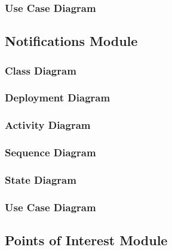 \documentclass{article}
\begin{document}
			
			\subsubsection{Use Case Diagram}\label{subsec:uml-diagrams-events-uc}
						
		\clearpage			
			
		\subsection{Notifications Module}\label{subsec:uml-diagrams-notifications}
		
		
			\subsubsection{Class Diagram}\label{subsec:uml-diagrams-notifications-class}
			
			
			\subsubsection{Deployment Diagram}\label{subsec:uml-diagrams-notifications-dep}
			
			
			\subsubsection{Activity Diagram}\label{subsec:uml-diagrams-notifications-act}
			
			
			\subsubsection{Sequence Diagram}\label{subsec:uml-diagrams-notifications-seq}
						
			
			\subsubsection{State Diagram}\label{subsec:uml-diagrams-notifications-state}
			
			
			\subsubsection{Use Case Diagram}\label{subsec:uml-diagrams-notifications-uc}
		
		\clearpage

		\subsection{Points of Interest Module}\label{subsec:uml-diagrams-poi}
		
\end{document}
